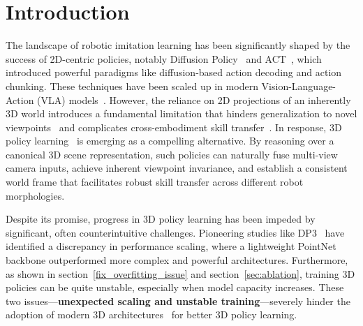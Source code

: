 \documentclass[runningheads]{llncs}
\begin{document}
\vspace{-6mm}
\begin{abstract}
3D policy learning promises superior generalization and cross-embodiment transfer, but progress has been hindered by training instabilities and severe overfitting, precluding the adoption of powerful 3D perception models. In this work, we systematically diagnose these failures, identifying the omission of 3D data augmentation and the adverse effects of Batch Normalization as primary causes. We propose a new architecture coupling a scalable transformer-based 3D encoder with a diffusion decoder, engineered specifically for stability at scale and designed to leverage large-scale pre-training. Our approach significantly outperforms state-of-the-art 3D baselines on challenging manipulation benchmarks, establishing a new and robust foundation for scalable 3D imitation learning. Project Page: \url{https://r3d-policy.github.io/}
\vspace{-3mm}
\end{abstract}

\vspace{-6mm}
\section{Introduction}
\label{sec:intro}
\vspace{-1mm}
The landscape of robotic imitation learning has been significantly shaped by the success of 2D-centric policies, notably Diffusion Policy~\cite{chi2024diffusionpolicyvisuomotorpolicy} and ACT~\cite{zhao2023learning}, which introduced powerful paradigms like diffusion-based action decoding and action chunking. These techniques have been scaled up in modern Vision-Language-Action (VLA) models~\cite{zitkovich2023rt,kim2024openvla,black2024pi_0,bu2025univla}.
However, the reliance on 2D projections of an inherently 3D world introduces a fundamental limitation that hinders generalization to novel viewpoints~\cite{xie2024gengap} and complicates cross-embodiment skill transfer~\cite{o2024open}. In response, 3D policy learning~\cite{ze20243d,ke20243ddiffuseractorpolicy,ze2024idp3} is emerging as a compelling alternative. By reasoning over a canonical 3D scene representation, such policies can naturally fuse multi-view camera inputs, achieve inherent viewpoint invariance, and establish a consistent world frame that facilitates robust skill transfer across different robot morphologies.


Despite its promise, progress in 3D policy learning has been impeded by significant, often counterintuitive challenges. Pioneering studies like DP3~\cite{ze20243d} have identified a discrepancy in performance scaling, where a lightweight PointNet backbone outperformed more complex and powerful architectures. Furthermore, as shown in section~\ref{fix_overfitting_issue} and section~\ref{sec:ablation}, training 3D policies can be quite unstable, especially when model capacity increases. These two issues—\textbf{unexpected scaling and unstable training}—severely hinder the adoption of modern 3D architectures~\cite{wu2024pointtransformerv3,zhou2023uni3d,zhou2024point} for better 3D policy learning.
\end{document}
